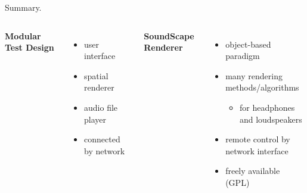 \documentclass{beamer}
\begin{document}
\begin{frame}{Summary.}
\begin{columns}[t]
\textbf{Modular Test Design}
\begin{itemize}
\item user interface
\item spatial renderer
\item audio file player
\item connected by network
\end{itemize}

\textbf{SoundScape Renderer}
\begin{itemize}
\item object-based paradigm
\item many rendering methods/algorithms
\begin{itemize}
\item for headphones and loudspeakers
\end{itemize}
\item remote control by network interface
\item freely available (GPL)
\end{itemize}
\end{columns}
\end{frame}

{
}
\end{document}
